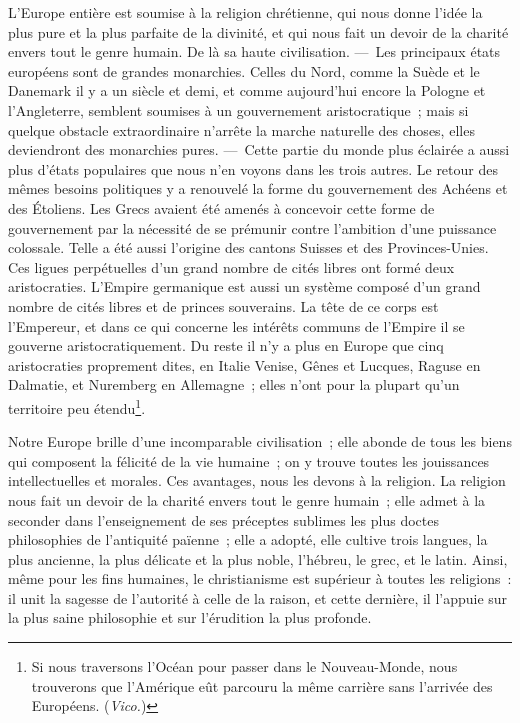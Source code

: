 \documentclass[french,twoside]{book} %
\begin{document}
L’Europe entière est soumise à la religion chrétienne, qui nous donne l’idée la plus pure et la plus parfaite de la divinité, et qui nous fait un devoir de la charité envers tout le genre humain. De là sa haute civilisation. — Les principaux états européens sont de grandes monarchies. Celles du Nord, comme la Suède et le Danemark il y a un siècle et demi, et comme aujourd’hui encore la Pologne et l’Angleterre, semblent soumises à un gouvernement aristocratique ; mais si quelque obstacle extraordinaire n’arrête la marche naturelle des choses, elles deviendront des monarchies pures. — Cette partie du monde plus éclairée a aussi plus d’états populaires que nous n’en voyons dans les trois autres. Le retour des mêmes besoins politiques y a renouvelé  la forme du gouvernement des Achéens et des Étoliens. Les Grecs avaient été amenés à concevoir cette forme de gouvernement par la nécessité de se prémunir contre l’ambition d’une puissance colossale. Telle a été aussi l’origine des cantons Suisses et des Provinces-Unies. Ces ligues perpétuelles d’un grand nombre de cités libres ont formé deux aristocraties. L’Empire germanique est aussi un système composé d’un grand nombre de cités libres et de princes souverains. La tête de ce corps est l’Empereur, et dans ce qui concerne les intérêts communs de l’Empire il se gouverne aristocratiquement. Du reste il n’y a plus en Europe que cinq aristocraties proprement dites, en Italie Venise, Gênes et Lucques, Raguse en Dalmatie, et Nuremberg en Allemagne ; elles n’ont pour la plupart qu’un territoire peu étendu\footnote{Si nous traversons l’Océan pour passer dans le Nouveau-Monde, nous trouverons que l’Amérique eût parcouru la même carrière sans l’arrivée des Européens. ({\itshape Vico.})}.\par
Notre Europe brille d’une incomparable civilisation ; elle abonde de tous les biens qui composent la félicité de la vie humaine ; on y trouve toutes les jouissances intellectuelles et morales. Ces avantages, nous les devons à la religion. La religion nous fait un devoir de la charité envers tout le genre humain ; elle admet à la seconder dans l’enseignement de ses préceptes sublimes les plus doctes philosophies de l’antiquité païenne ; elle a adopté, elle cultive trois langues, la plus ancienne, la  plus délicate et la plus noble, l’hébreu, le grec, et le latin. Ainsi, même pour les fins humaines, le christianisme est supérieur à toutes les religions : il unit la sagesse de l’autorité à celle de la raison, et cette dernière, il l’appuie sur la plus saine philosophie et sur l’érudition la plus profonde.\par
\end{document}
